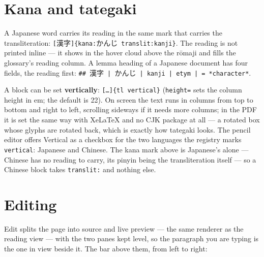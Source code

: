 \documentclass[11pt,oneside]{report}
\newcommand{\jw}[1]{\mbox{\foreignlanguage{japanese}{#1}}}
\newcommand{\menu}[1]{\textsf{#1}}
\begin{document}
\section{Kana and tategaki}
\label{sec:tategaki}

A Japanese word carries its reading in the same mark that carries the
transliteration: \texttt{[}\jw{漢字}\texttt{]\{kana:}\jw{かんじ}\texttt{
translit:kanji\}}. The reading is not printed inline --- it shows in the
hover cloud above the r\=omaji and fills the glossary's reading column. A
lemma heading of a Japanese document has four fields, the reading first:
\texttt{\#\# }\jw{漢字}\texttt{ | }\jw{かんじ}\texttt{ | kanji | etym | = *character*}.

A block can be set \textbf{vertically}: \texttt{[\ldots]\{tl vertical\}}
(\texttt{height=} sets the column height in em; the default is 22). On
screen the text runs in columns from top to bottom and right to left,
scrolling sideways if it needs more columns; in the PDF it is set the same
way with XeLaTeX and no CJK package at all --- a rotated box whose glyphs
are rotated back, which is exactly how tategaki looks. The pencil editor
offers \menu{Vertical} as a checkbox for the two languages the registry marks
\texttt{vertical}: Japanese and Chinese. The kana mark above is Japanese's
alone --- Chinese has no reading to carry, its pinyin being the
transliteration itself --- so a Chinese block takes \texttt{translit:} and
nothing else.

\section{Editing}
\label{sec:editor}

\menu{Edit} splits the page into source and live preview --- the same
renderer as the reading view --- with the two panes kept level, so the
paragraph you are typing is the one in view beside it. The bar above them,
from left to right:
\end{document}
